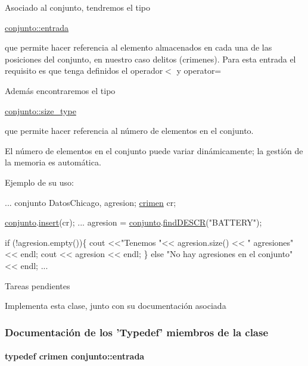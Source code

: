 Asociado al conjunto, tendremos el tipo
\begin{DoxyCode}
\hyperlink{classcrimen}{conjunto::entrada} 
\end{DoxyCode}
 que permite hacer referencia al elemento almacenados en cada una de las posiciones del conjunto, en nuestro caso delitos (crimenes). Para esta entrada el requisito es que tenga definidos el operador$<$ y operator=

Además encontraremos el tipo
\begin{DoxyCode}
\hyperlink{classconjunto_a855a5893bb0f5a851ab2dbf2b8aa6cc7}{conjunto::size\_type} 
\end{DoxyCode}
 que permite hacer referencia al número de elementos en el conjunto.

El número de elementos en el conjunto puede variar dinámicamente; la gestión de la memoria es automática.

Ejemplo de su uso\-: 
\begin{DoxyCode}
...
conjunto DatosChicago, agresion;
\hyperlink{classcrimen}{crimen} cr;

\hyperlink{classconjunto}{conjunto}.\hyperlink{classconjunto_aa65b9f7c4cb9bad6d4e40c1973095930}{insert}(cr);
...
agresion = \hyperlink{classconjunto}{conjunto}.\hyperlink{classconjunto_a5190c59db573008cc48a8ce734954a96}{findDESCR}(\textcolor{stringliteral}{"BATTERY"});

\textcolor{keywordflow}{if} (!agresion.empty())\{
 cout <<\textcolor{stringliteral}{"Tenemos "}<< agresion.size() << \textcolor{stringliteral}{" agresiones"} << endl;
 cout << agresion << endl;
\} \textcolor{keywordflow}{else} \textcolor{stringliteral}{"No hay agresiones en el conjunto"} << endl;
...
\end{DoxyCode}
 \begin{DoxyRefDesc}{Tareas pendientes}
\item[\hyperlink{todo__todo000003}{Tareas pendientes}]Implementa esta clase, junto con su documentación asociada \end{DoxyRefDesc}


\subsubsection{Documentación de los 'Typedef' miembros de la clase}
\hypertarget{classconjunto_a09cad766dd65de73e51eae21f9d22585}{
\paragraph[{entrada}]{\setlength{\rightskip}{0pt plus 5cm}typedef {\bf crimen} {\bf conjunto\-::entrada}}}\label{classconjunto_a09cad766dd65de73e51eae21f9d22585}


